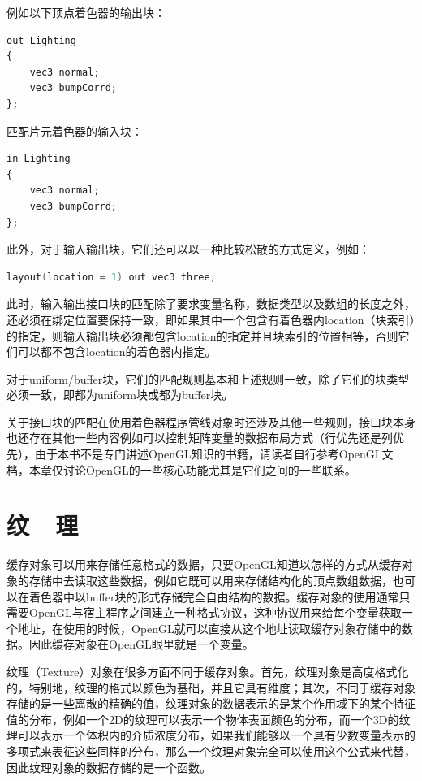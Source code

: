例如以下顶点着色器的输出块：

\begin{lstlisting}
out Lighting 
{
	vec3 normal;
	vec3 bumpCorrd;
};
\end{lstlisting}

匹配片元着色器的输入块：

\begin{lstlisting}
in Lighting 
{
	vec3 normal;
	vec3 bumpCorrd;
};
\end{lstlisting}


此外，对于输入输出块，它们还可以以一种比较松散的方式定义，例如：

\begin{lstlisting}[language=C++]
layout(location = 1) out vec3 three;
\end{lstlisting}

此时，输入输出接口块的匹配除了要求变量名称，数据类型以及数组的长度之外，还必须在绑定位置要保持一致，即如果其中一个包含有着色器内location（块索引）的指定，则输入输出块必须都包含location的指定并且块索引的位置相等，否则它们可以都不包含location的着色器内指定。

对于uniform/buffer块，它们的匹配规则基本和上述规则一致，除了它们的块类型必须一致，即都为uniform块或都为buffer块。

关于接口块的匹配在使用着色器程序管线对象时还涉及其他一些规则，接口块本身也还存在其他一些内容例如可以控制矩阵变量的数据布局方式（行优先还是列优先），由于本书不是专门讲述OpenGL知识的书籍，请读者自行参考OpenGL文档，本章仅讨论OpenGL的一些核心功能尤其是它们之间的一些联系。







\section{纹~~理}\label{sec:api-textures}
缓存对象可以用来存储任意格式的数据，只要OpenGL知道以怎样的方式从缓存对象的存储中去读取这些数据，例如它既可以用来存储结构化的顶点数组数据，也可以在着色器中以buffer块的形式存储完全自由结构的数据。缓存对象的使用通常只需要OpenGL与宿主程序之间建立一种格式协议，这种协议用来给每个变量获取一个地址，在使用的时候，OpenGL就可以直接从这个地址读取缓存对象存储中的数据。因此缓存对象在OpenGL眼里就是一个变量。

纹理（Texture）对象在很多方面不同于缓存对象。首先，纹理对象是高度格式化的，特别地，纹理的格式以颜色为基础，并且它具有维度；其次，不同于缓存对象存储的是一些离散的精确的值，纹理对象的数据表示的是某个作用域下的某个特征值的分布，例如一个2D的纹理可以表示一个物体表面颜色的分布，而一个3D的纹理可以表示一个体积内的介质浓度分布，如果我们能够以一个具有少数变量表示的多项式来表征这些同样的分布，那么一个纹理对象完全可以使用这个公式来代替，因此纹理对象的数据存储的是一个函数。

